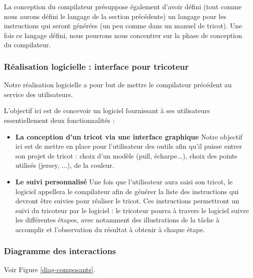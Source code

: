 \documentclass{article}
\begin{document}
La conception du compilateur présuppose également d'avoir défini (tout comme nous aurons défini le langage de la section précédente) un
langage pour les instructions qui seront générées (un peu comme dans un manuel de tricot).
Une fois ce langage défini, nous pourrons nous concentrer sur la phase de conception du compilateur.

\subsubsection{Réalisation logicielle : interface pour tricoteur}

Notre réalisation logicielle a pour but de mettre le compilateur précédent au service des utilisateurs.

L'objectif ici est de concevoir un logiciel fournissant à ses utilisateurs essentiellement deux fonctionnalités :
\begin{itemize}
  \item \textbf{La conception d'un tricot via une interface graphique} Notre objectif ici est de mettre en place pour l'utilisateur des
  outils afin qu'il puisse entrer son projet de tricot : choix d'un modèle (pull, écharpe...), choix des points utilisés
  (jersey, ...), de la couleur.
  \item \textbf{Le suivi personnalisé} Une fois que l'utilisateur aura saisi son tricot, le logiciel appellera le compilateur afin de générer
la liste des instructions qui devront être suivies pour réaliser le tricot. Ces instructions permettront un suivi du tricoteur par le
logiciel : le tricoteur pourra à travers le logiciel suivre les différentes étapes, avec notamment des illustrations de la tâche à
accomplir et l'observation du résultat à obtenir à chaque étape.
\end{itemize}

\subsubsection{Diagramme des interactions}

    Voir Figure \ref{diag-composants}.
\end{document}
